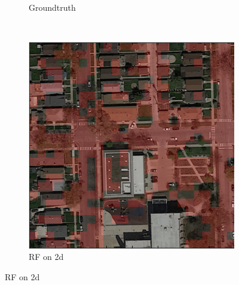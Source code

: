 \documentclass[10pt,conference,compsocconf]{IEEEtran}
\begin{document}
\begin{figure}[!h]
\begin{subfigure}[b]{0.12\textwidth}
		\caption{Groundtruth}
	\end{subfigure}
	~ %
	\begin{subfigure}[b]{0.12\textwidth}
		\includegraphics[width=\textwidth]{baseline2.png}
		\caption{RF on 2d}
	\end{subfigure}


\end{figure}
\end{document}
